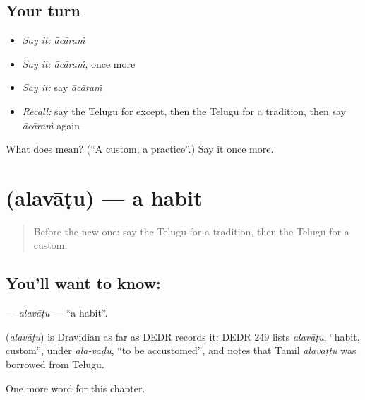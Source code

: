 \subsection*{Your turn}
\begin{itemize}
\raggedright
  \item \emph{Say it:} \emph{ācāraṁ}
  \item \emph{Say it:} \emph{ācāraṁ}, once more
  \item \emph{Say it:} say \emph{ācāraṁ}
  \item \emph{Recall:} say the Telugu for except, then the Telugu for a tradition, then say \emph{ācāraṁ} again
\end{itemize}

\begin{tcolorbox}[breakable,colback=teal!4,colframe=teal!35!black,title={Before you move on}]
What does  mean? (\textquotedblleft{}A custom, a practice\textquotedblright{}.) Say it once more.
\end{tcolorbox}
\section[\texorpdfstring{\te{అలవాటు} (alavāṭu)}{అలవాటు (alavāṭu)}]{ (alavāṭu) — a habit}

\label{lesson:TE-C217-alavatu}



\begin{quote}
Before the new one: say the Telugu for a tradition, then the Telugu for a custom.
\end{quote}

\subsection*{You'll want to know: }
\textbf{} — \emph{alavāṭu} — \textquotedblleft{}a habit\textquotedblright{}.

\begin{cousinweb}
\textbf{} (\emph{alavāṭu}) is Dravidian as far as DEDR records it: DEDR 249 lists \emph{alavāṭu}, \textquotedblleft{}habit, custom\textquotedblright{}, under \emph{ala-vaḍu}, \textquotedblleft{}to be accustomed\textquotedblright{}, and notes that Tamil \emph{alavāṭṭu} was borrowed from Telugu.
\end{cousinweb}

\begin{grammarlens}[title={What you've built}]
One more word for this chapter.
\end{grammarlens}

